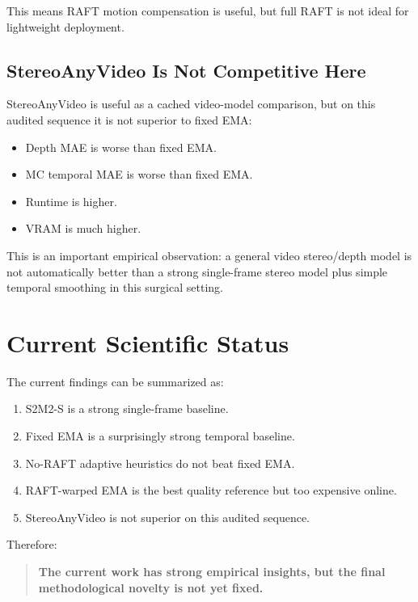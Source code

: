 \documentclass[11pt,a4paper]{article}
\begin{document}
This means RAFT motion compensation is useful, but full RAFT is not ideal for lightweight deployment.

\subsection{StereoAnyVideo Is Not Competitive Here}

StereoAnyVideo is useful as a cached video-model comparison, but on this audited sequence it is not superior to fixed EMA:

\begin{itemize}[leftmargin=*]
    \item Depth MAE is worse than fixed EMA.
    \item MC temporal MAE is worse than fixed EMA.
    \item Runtime is higher.
    \item VRAM is much higher.
\end{itemize}

This is an important empirical observation: a general video stereo/depth model is not automatically better than a strong single-frame stereo model plus simple temporal smoothing in this surgical setting.

\section{Current Scientific Status}

The current findings can be summarized as:

\begin{enumerate}[leftmargin=*]
    \item S2M2-S is a strong single-frame baseline.
    \item Fixed EMA is a surprisingly strong temporal baseline.
    \item No-RAFT adaptive heuristics do not beat fixed EMA.
    \item RAFT-warped EMA is the best quality reference but too expensive online.
    \item StereoAnyVideo is not superior on this audited sequence.
\end{enumerate}

Therefore:

\begin{quote}
\textbf{The current work has strong empirical insights, but the final methodological novelty is not yet fixed.}
\end{quote}
\end{document}
